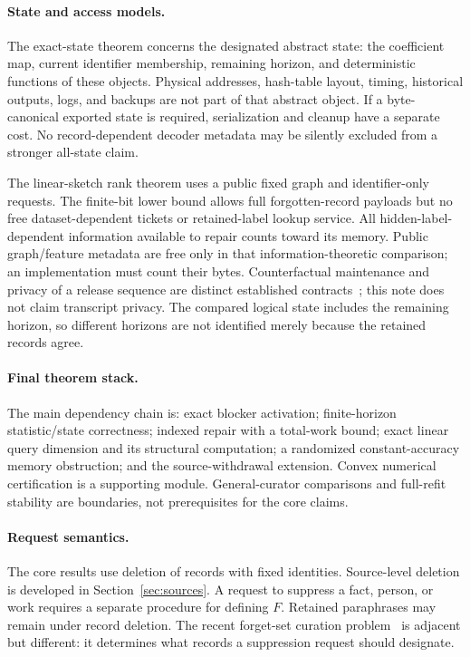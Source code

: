 \documentclass[11pt,a4paper]{article}
\theoremstyle{definition}\newtheorem{definition}[theorem]{Definition}
\begin{document}
\paragraph{State and access models.} The exact-state theorem concerns the designated abstract state: the coefficient map, current identifier membership, remaining horizon, and deterministic functions of these objects. Physical addresses, hash-table layout, timing, historical outputs, logs, and backups are not part of that abstract object. If a byte-canonical exported state is required, serialization and cleanup have a separate cost. No record-dependent decoder metadata may be silently excluded from a stronger all-state claim.

The linear-sketch rank theorem uses a public fixed graph and identifier-only requests. The finite-bit lower bound allows full forgotten-record payloads but no free dataset-dependent tickets or retained-label lookup service. All hidden-label-dependent information available to repair counts toward its memory. Public graph/feature metadata are free only in that information-theoretic comparison; an implementation must count their bytes. Counterfactual maintenance and privacy of a release sequence are distinct established contracts~\cite{cohen2023,kaplan2026}; this note does not claim transcript privacy. The compared logical state includes the remaining horizon, so different horizons are not identified merely because the retained records agree.

\paragraph{Final theorem stack.} The main dependency chain is: exact blocker activation; finite-horizon statistic/state correctness; indexed repair with a total-work bound; exact linear query dimension and its structural computation; a randomized constant-accuracy memory obstruction; and the source-withdrawal extension. Convex numerical certification is a supporting module. General-curator comparisons and full-refit stability are boundaries, not prerequisites for the core claims.

\paragraph{Request semantics.} The core results use deletion of records with fixed identities. Source-level deletion is developed in Section~\ref{sec:sources}. A request to suppress a fact, person, or work requires a separate procedure for defining $F$. Retained paraphrases may remain under record deletion. The recent forget-set curation problem~\cite{jha2026} is adjacent but different: it determines what records a suppression request should designate.
\end{document}
